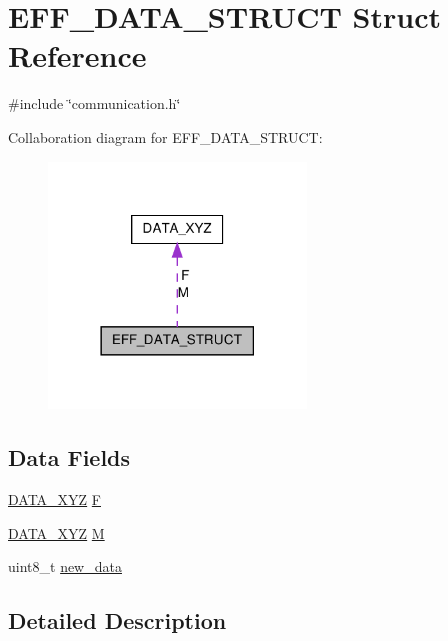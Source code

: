 \hypertarget{structEFF__DATA__STRUCT}{\section{E\-F\-F\-\_\-\-D\-A\-T\-A\-\_\-\-S\-T\-R\-U\-C\-T Struct Reference}
\label{structEFF__DATA__STRUCT}
}


{\ttfamily \#include \char`\"{}communication.\-h\char`\"{}}



Collaboration diagram for E\-F\-F\-\_\-\-D\-A\-T\-A\-\_\-\-S\-T\-R\-U\-C\-T\-:\nopagebreak
\begin{figure}[H]
\begin{center}
\leavevmode
\includegraphics[width=194pt]{structEFF__DATA__STRUCT__coll__graph}
\end{center}
\end{figure}
\subsection*{Data Fields}
\begin{DoxyCompactItemize}
\item 
\hyperlink{structDATA__XYZ}{D\-A\-T\-A\-\_\-\-X\-Y\-Z} \hyperlink{structEFF__DATA__STRUCT_abe8952947b54bf9c247f3429ee3aeb44}{F}
\item 
\hyperlink{structDATA__XYZ}{D\-A\-T\-A\-\_\-\-X\-Y\-Z} \hyperlink{structEFF__DATA__STRUCT_aaf6e03b6e600295e0f5c706fc869e9d1}{M}
\item 
uint8\-\_\-t \hyperlink{structEFF__DATA__STRUCT_aa42ebc512dd79fa6ebf998162a149446}{new\-\_\-data}
\end{DoxyCompactItemize}


\subsection{Detailed Description}


